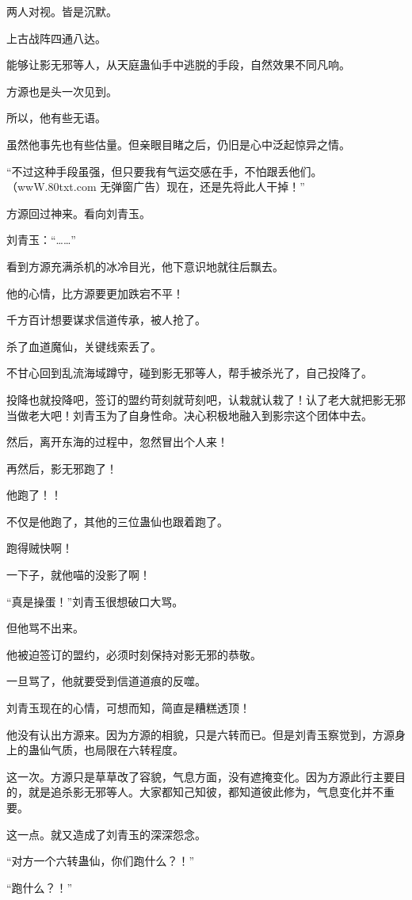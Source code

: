 \begin{this_body}
两人对视。皆是沉默。

上古战阵四通八达。

能够让影无邪等人，从天庭蛊仙手中逃脱的手段，自然效果不同凡响。

方源也是头一次见到。

所以，他有些无语。

虽然他事先也有些估量。但亲眼目睹之后，仍旧是心中泛起惊异之情。

“不过这种手段虽强，但只要我有气运交感在手，不怕跟丢他们。（wwW.80txt.com 无弹窗广告）现在，还是先将此人干掉！”

方源回过神来。看向刘青玉。

刘青玉：“……”

看到方源充满杀机的冰冷目光，他下意识地就往后飘去。

他的心情，比方源要更加跌宕不平！

千方百计想要谋求信道传承，被人抢了。

杀了血道魔仙，关键线索丢了。

不甘心回到乱流海域蹲守，碰到影无邪等人，帮手被杀光了，自己投降了。

投降也就投降吧，签订的盟约苛刻就苛刻吧，认栽就认栽了！认了老大就把影无邪当做老大吧！刘青玉为了自身性命。决心积极地融入到影宗这个团体中去。

然后，离开东海的过程中，忽然冒出个人来！

再然后，影无邪跑了！

他跑了！！

不仅是他跑了，其他的三位蛊仙也跟着跑了。

跑得贼快啊！

一下子，就他喵的没影了啊！

“真是操蛋！”刘青玉很想破口大骂。

但他骂不出来。

他被迫签订的盟约，必须时刻保持对影无邪的恭敬。

一旦骂了，他就要受到信道道痕的反噬。

刘青玉现在的心情，可想而知，简直是糟糕透顶！

他没有认出方源来。因为方源的相貌，只是六转而已。但是刘青玉察觉到，方源身上的蛊仙气质，也局限在六转程度。

这一次。方源只是草草改了容貌，气息方面，没有遮掩变化。因为方源此行主要目的，就是追杀影无邪等人。大家都知己知彼，都知道彼此修为，气息变化并不重要。

这一点。就又造成了刘青玉的深深怨念。

“对方一个六转蛊仙，你们跑什么？！”

“跑什么？！”


\end{this_body}
